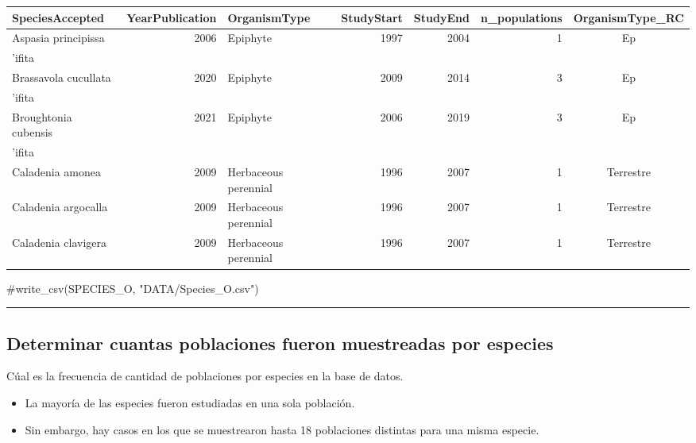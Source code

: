 \documentclass[
  12pt,
  letterpaper,
]{book}
\newenvironment{Shaded}{\begin{snugshade}}{\end{snugshade}}
\newcommand{\CommentTok}[1]{\textcolor[rgb]{0.37,0.37,0.37}{#1}}
\begin{document}
\begin{table}
\fontsize{12.0pt}{14.0pt}\selectfont
\begin{tabular*}{\linewidth}{@{\extracolsep{\fill}}lrlrrrc}
\toprule
SpeciesAccepted & YearPublication & OrganismType & StudyStart & StudyEnd & n\_populations & OrganismType\_RC \\ 
\midrule\addlinespace[2.5pt]
Aspasia principissa & 2006 & Epiphyte & 1997 & 2004 & 1 & Ep\\'ifita \\ 
Brassavola cucullata & 2020 & Epiphyte & 2009 & 2014 & 3 & Ep\\'ifita \\ 
Broughtonia cubensis & 2021 & Epiphyte & 2006 & 2019 & 3 & Ep\\'ifita \\ 
Caladenia amonea & 2009 & Herbaceous perennial & 1996 & 2007 & 1 & Terrestre \\ 
Caladenia argocalla & 2009 & Herbaceous perennial & 1996 & 2007 & 1 & Terrestre \\ 
Caladenia clavigera & 2009 & Herbaceous perennial & 1996 & 2007 & 1 & Terrestre \\ 
\bottomrule
\end{tabular*}
\end{table}

\begin{Shaded}
\begin{Highlighting}[]
\CommentTok{\#write\_csv(SPECIES\_O, "DATA/Species\_O.csv")}
\end{Highlighting}
\end{Shaded}

\begin{center}\rule{0.5\linewidth}{0.5pt}\end{center}

\subsection{Determinar cuantas poblaciones fueron muestreadas por
especies}\label{determinar-cuantas-poblaciones-fueron-muestreadas-por-especies}

Cúal es la frecuencia de cantidad de poblaciones por especies en la base
de datos.

\begin{itemize}
\item
  La mayoría de las especies fueron estudiadas en una sola población.
\item
  Sin embargo, hay casos en los que se muestrearon hasta 18 poblaciones
  distintas para una misma especie.
\end{itemize}
\end{document}
